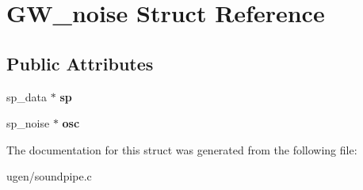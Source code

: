 \hypertarget{structGW__noise}{}\section{G\+W\+\_\+noise Struct Reference}
\label{structGW__noise}
\subsection*{Public Attributes}
\begin{DoxyCompactItemize}
\item 
\hypertarget{structGW__noise_a8e21bcc773285bd080c4e50f0efda66e}{}\label{structGW__noise_a8e21bcc773285bd080c4e50f0efda66e} 
sp\+\_\+data $\ast$ {\bfseries sp}
\item 
\hypertarget{structGW__noise_a1a5bc001446be99529b690bdf2494d76}{}\label{structGW__noise_a1a5bc001446be99529b690bdf2494d76} 
sp\+\_\+noise $\ast$ {\bfseries osc}
\end{DoxyCompactItemize}


The documentation for this struct was generated from the following file\+:\begin{DoxyCompactItemize}
\item 
ugen/soundpipe.\+c\end{DoxyCompactItemize}
